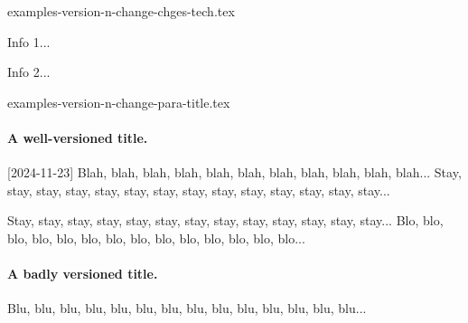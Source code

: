 \begin{filecontents*}[overwrite]{gallery-showcase-draft.tex}
        \subsection*{tdoc#1}

        \myadmotext

        \begin{tdoc#1}
            \myhighlightedtext
        \end{tdoc#1}

        \myadmotext
    }
}

\ExplSyntaxOff

\section{\LaTeX\ codes}

It is essential to be able to demonstrate use cases in \LaTeX.

\begin{tdoclatex}
It's nice to see some formatted \LaTeX\ code : $E = m c^2$ ou $\pi \neq \frac{3}{14}$.
\end{tdoclatex}


There's also a less intrusive side-by-side mode. Nice! No ?

\begin{tdoclatex}[sbs]
It's nice to see some formatted \LaTeX\ code:
$E = m c^2$ or $\pi \neq \frac{3}{14}$.
\end{tdoclatex}



\end{filecontents*}


\begin{filecontents*}[overwrite]{examples-version-n-change-chges-tech.tex}
\begin{tdoctech}
    \item Info 1...
    \item Info 2...
\end{tdoctech}
\end{filecontents*}


\begin{filecontents*}[overwrite]{examples-version-n-change-para-title.tex}
\paragraph{A well-versioned title.}
[2024-11-23]
Blah, blah, blah, blah, blah, blah, blah, blah, blah, blah, blah...
Stay, stay, stay, stay, stay, stay, stay, stay, stay, stay, stay, stay, stay, stay...

Stay, stay, stay, stay, stay, stay, stay, stay, stay, stay, stay, stay, stay...
Blo, blo, blo, blo, blo, blo, blo, blo, blo, blo, blo, blo, blo, blo...

\paragraph{A badly versioned title.}
Blu, blu, blu, blu, blu, blu, blu, blu, blu, blu, blu, blu, blu, blu...
\end{filecontents*}


